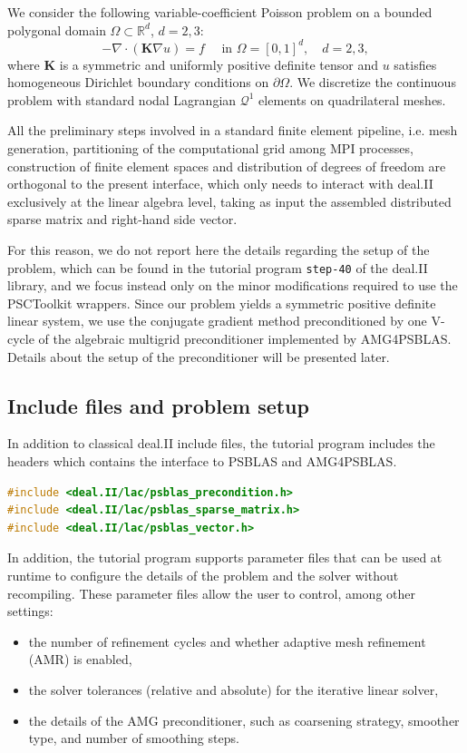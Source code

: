 \documentclass[a4paper,12pt]{article}
\begin{document}
We consider the following variable-coefficient Poisson problem on a bounded polygonal domain $\Omega \subset \mathbb{R}^d$, $d=2,3$:
$$-\nabla \cdot ( \mathbf{K} \nabla u) = f \quad \text{ in } \Omega = [0,1]^d, \quad d=2,3,$$
where $\mathbf{K}$ is a symmetric and uniformly positive definite tensor and $u$ satisfies homogeneous Dirichlet boundary conditions on $\partial \Omega$. We discretize the continuous problem with standard nodal Lagrangian $\mathcal{Q}^1$ elements on quadrilateral meshes.

All the preliminary steps involved in a standard finite element pipeline, i.e. mesh generation, partitioning
of the computational grid among MPI processes, construction of finite element spaces and distribution of
degrees of freedom are orthogonal to the present interface, which only needs to interact
with deal.II exclusively at the linear algebra level, taking as input the
assembled distributed sparse matrix and right-hand side vector.

For this reason, we do not report here the details regarding the setup of the problem, which can be found in the tutorial program \texttt{step-40} of the
deal.II library, and we focus instead only on the minor modifications required to use the PSCToolkit wrappers. Since our problem
yields a symmetric positive definite linear system, we use the conjugate gradient method preconditioned by one V-cycle of the algebraic
multigrid preconditioner implemented by AMG4PSBLAS. Details about the setup of the preconditioner will be presented later.

\subsection{Include files and problem setup}
In addition to classical deal.II include files, the tutorial program includes
the headers which contains the interface to PSBLAS and AMG4PSBLAS.

\begin{lstlisting}[language=C++,caption=New header files]
#include <deal.II/lac/psblas_precondition.h>
#include <deal.II/lac/psblas_sparse_matrix.h>
#include <deal.II/lac/psblas_vector.h>
\end{lstlisting}

In addition, the tutorial program supports parameter files that can be used at runtime
to configure the details of the problem and the solver without recompiling. These
parameter files allow the user to control, among other settings:
\begin{itemize}\itemsep0pt\parskip0pt
  \item the number of refinement cycles and whether adaptive mesh refinement (AMR) is enabled,
  \item the solver tolerances (relative and absolute) for the iterative linear solver,
  \item the details of the AMG preconditioner, such as coarsening strategy, smoother type,
        and number of smoothing steps.
\end{itemize}
\end{document}
